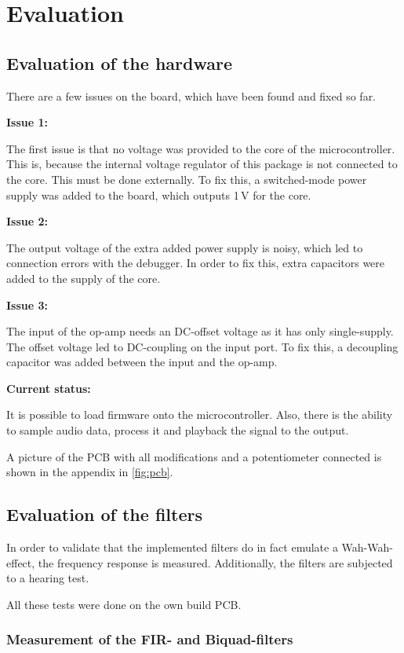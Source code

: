 \section{Evaluation}

\subsection{Evaluation of the hardware}

There are a few issues on the board, which have been found and fixed so far.

\textbf{Issue 1:}

The first issue is that no voltage was provided to the core of the microcontroller. This is, because
the internal voltage regulator of this package is not connected to the core. This must be done 
externally. To fix this, a switched-mode power supply was added to the board, which outputs 1\,V
for the core.

\textbf{Issue 2:}

The output voltage of the extra added power supply is noisy, which led to connection errors with the debugger.
In order to fix this, extra capacitors were added to the supply of the core.

\textbf{Issue 3:}

The input of the op-amp needs an DC-offset voltage as it has only single-supply. The offset voltage led
to DC-coupling on the input port. To fix this, a decoupling capacitor was added between the input and the op-amp.

\textbf{Current status:}

It is possible to load firmware onto the microcontroller. Also, there is the ability to sample audio data,
process it and playback the signal to the output.

A picture of the \ac{PCB} with all modifications and a potentiometer connected is shown in the appendix in \autoref{fig:pcb}.

\subsection{Evaluation of the filters}

In order to validate that the implemented filters do in fact emulate a Wah-Wah-effect,
the frequency response is measured. Additionally, the filters are subjected to a hearing test.

All these tests were done on the own build \ac{PCB}.

\subsubsection{Measurement of the \ac{FIR}- and Biquad-filters}

